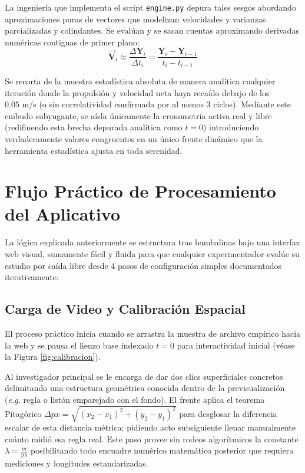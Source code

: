\documentclass[12pt,a4paper]{article}
\begin{document}
La ingeniería que implementa el script \texttt{engine.py} depura tales sesgos abordando aproximaciones puras de vectores que modelizan velocidades y varianzas parcializadas y colindantes. Se evalúan y se sacan cuentas aproximando derivadas numéricas contiguas de primer plano:
$$ \mathbf{\vec{V}}_i \approx \frac{ \Delta \mathbf{Y}_i }{ \Delta t_i } = \frac{\mathbf{Y}_i - \mathbf{Y}_{i-1}}{t_i - t_{i-1}} $$

Se recorta de la muestra estadística absoluta de manera analítica cualquier iteración donde la propulsión y velocidad neta haya recaído debajo de los $0.05 \text{ m/s}$ (o sin correlatividad confirmada por al menos 3 ciclos). Mediante este embudo subyugante, se aísla únicamente la cronometría activa real y libre (redifinendo esta brecha depurada analítica como $t=0$) introduciendo verdaderamente valores congruentes en un único frente dinámico que la herramienta estadística ajusta en toda serenidad.

\section{Flujo Práctico de Procesamiento del Aplicativo}
La lógica explicada anteriormente se estructura tras bambalinas bajo una interfaz web visual, sumamente fácil y fluida para que cualquier experimentador evalúe su estudio por caída libre desde 4 pasos de configuración simples documentados iterativamente:

\subsection{Carga de Video y Calibración Espacial}
El proceso práctico inicia cuando se arrastra la muestra de archivo empírico hacia la web y se pausa el lienzo base indexado $t=0$ para interactividad inicial (véase la Figura \ref{fig:calibracion}).

Al investigador principal se le encarga de dar dos clics superficiales concretos delimitando una estructura geométrica conocida dentro de la previsualización (\textit{e.g.} regla o listón emparejado con el fondo). El frente aplica el teorema Pitagórico $\Delta px = \sqrt{(x_2-x_1)^2 + (y_2 - y_1)^2}$ para desglosar la diferencia escalar de esta distancia métrica; pidiendo acto subsiguiente llenar manualmente cuánto midió esa regla real. Este paso provee sin rodeos algorítmicos la constante $\lambda = \frac{m}{\text{px}}$ posibilitando todo encuadre numérico matemático posterior que requiera mediciones y longitudes estandarizadas.
\end{document}
